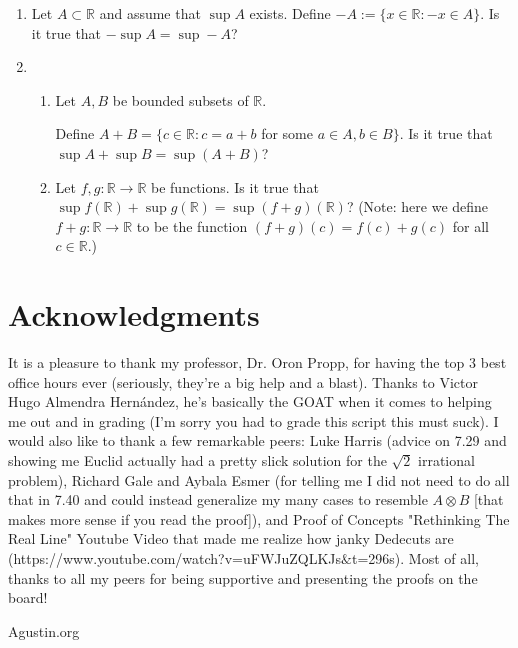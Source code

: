 \documentclass[openany, amssymb, psamsfonts]{amsart}
\newcommand{\bbR}{\mathbb{R}}
\theoremstyle{definition}
\numberwithin{equation}{section}
\begin{document}
\begin{enumerate}
\item Let $A \subset \bbR$ and assume that $\sup A$ exists.  Define $-A := \{ x \in \bbR : -x \in A\}$.  Is it true that $-\sup A = \sup -A$?

\item 
\begin{enumerate}
		\item Let $A,B$ be bounded subsets of $\bbR.$
		
			Define $A+B = \{c \in \bbR: c = a+b$ for some $a\in A, b\in B\}$.  Is it true that $\sup A + \sup B = \sup(A+B)$?
		\item Let $f,g: \bbR \to \bbR$ be functions.  Is it true that $\sup f(\bbR) + \sup g(\bbR)= \sup (f+g)(\bbR)$?  (Note: here we define $f+g:\bbR \to \bbR$ to be the function $(f+g)(c) = f(c) + g(c)$ for all $c\in \bbR$.)
	\end{enumerate}



\end{enumerate}

\section*{Acknowledgments} It is a pleasure to thank my professor, Dr. Oron Propp, for having the top 3 best office hours ever (seriously, they're a big help and a blast). Thanks to Victor Hugo Almendra Hernández, he's basically the GOAT when it comes to helping me out and in grading (I'm sorry you had to grade this script this must suck). I would also like to thank a few remarkable peers: Luke Harris (advice on 7.29 and showing me Euclid actually had a pretty slick solution for the $\sqrt{2}$ irrational problem), Richard Gale and Aybala Esmer (for telling me I did not need to do all that in 7.40 and could instead generalize my many cases to resemble $A\otimes B$ [that makes more sense if you read the proof]), and Proof of Concepts "Rethinking The Real Line" Youtube Video that made me realize how janky Dedecuts are (https://www.youtube.com/watch?v=uFWJuZQLKJs$\&$t=296s). Most of all, thanks to all my peers for being supportive and presenting the proofs on the board!

\begin{thebibliography}{9}

 Agustin.org


\end{thebibliography}
\end{document}
